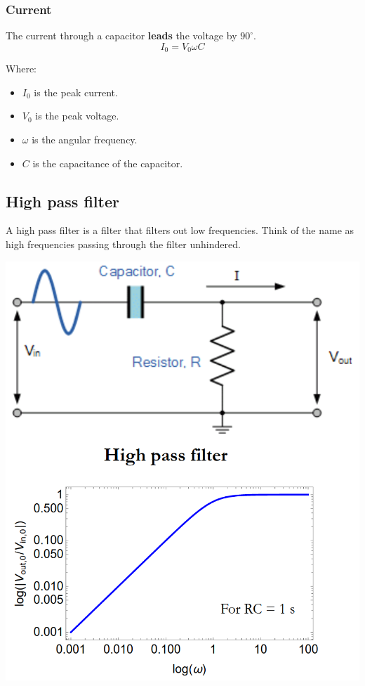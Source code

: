 \documentclass[11pt]{article}
\begin{document}
\subsubsection{Current}
\label{sec:org7d7140c}
The current through a capacitor \textbf{leads} the voltage by \(90^{\circ}\).
\[I_0 = V_0 \omega C\]

Where:
\begin{itemize}
\item \(I_0\) is the peak current.
\item \(V_0\) is the peak voltage.
\item \(\omega\) is the angular frequency.
\item \(C\) is the capacitance of the capacitor.
\end{itemize}
\subsection{High pass filter}
\label{sec:org6721c19}
A high pass filter is a filter that filters out low frequencies. Think of the name as high frequencies passing through the filter unhindered.

\begin{center}
\includegraphics[scale=0.69]{./images/high-pass-filter.png}
\end{center}
\end{document}
